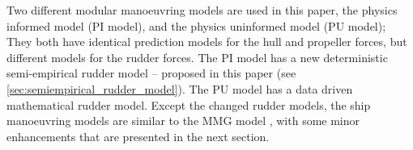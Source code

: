 Two different modular manoeuvring models are used in this paper, the physics informed model (PI model), and the physics uninformed model (PU model); They both have identical prediction models for the hull and propeller forces, but different models for the rudder forces. The PI model has a new deterministic semi-empirical rudder model -- proposed in this paper (see \autoref{sec:semiempirical_rudder_model}). The PU model has a data driven mathematical rudder model. 
Except the changed rudder models, the ship manoeuvring models are similar to the MMG model \citep{yasukawa_introduction_2015}, with some minor enhancements that are presented in the next section.